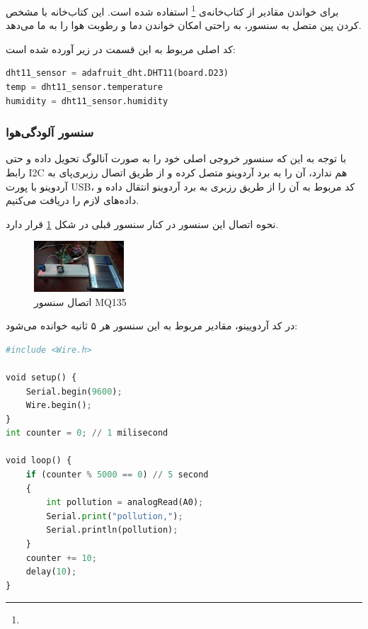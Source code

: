 برای خواندن مقادیر از کتاب‌خانه‌ی 
\footnote{}
استفاده شده است. این کتاب‌خانه با مشخص کردن پین متصل به سنسور، به راحتی امکان خواندن دما و رطوبت هوا را به ما می‌دهد.

کد اصلی مربوط به این قسمت در زیر آورده شده است:

\begin{latin}
\begin{lstlisting}[language=python]
dht11_sensor = adafruit_dht.DHT11(board.D23)
temp = dht11_sensor.temperature
humidity = dht11_sensor.humidity

\end{lstlisting}
\end{latin}

\subsubsection{سنسور آلودگی‌هوا}

با توجه به این که  سنسور  خروجی اصلی خود را به صورت آنالوگ تحویل داده و حتی رابط I2C هم ندارد، آن را به برد آردوینو متصل کرده و از طریق اتصال رزبری‌پای به آردوینو با پورت USB، کد مربوط به آن را از طریق رزبری به برد آردوینو انتقال داده و داده‌های لازم را دریافت می‌کنیم.

نحوه اتصال این سنسور در کنار سنسور قبلی در شکل \ref{fig:3} قرار دارد.

\begin{figure}[ht!]
	\centering
	\includegraphics[width=0.3\textwidth]{figs/dhtmq2.jpg}
	
	\caption{اتصال سنسور MQ135}
	\label{fig:3}
\end{figure}


در کد آردویینو، مقادیر مربوط به این سنسور هر ۵ ثانیه خوانده می‌شود:
\begin{latin}
	\begin{lstlisting}[language=python]
#include <Wire.h>

void setup() {
	Serial.begin(9600);
	Wire.begin();
}
int counter = 0; // 1 milisecond

void loop() {	
	if (counter % 5000 == 0) // 5 second
	{
		int pollution = analogRead(A0);
		Serial.print("pollution,");
		Serial.println(pollution);
	} 
	counter += 10;
	delay(10);
}
	\end{lstlisting}
\end{latin}

